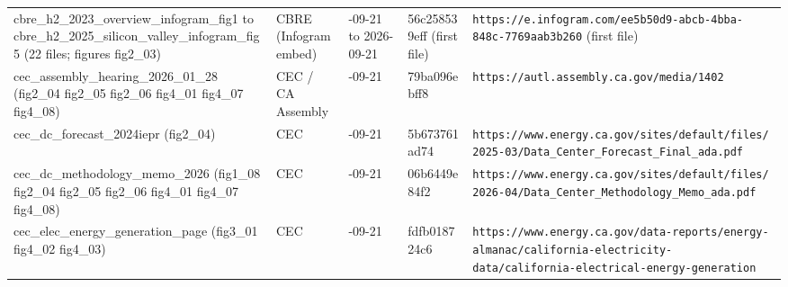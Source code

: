 \begin{longtable}{>{\raggedright\arraybackslash}p{3.0cm}>{\raggedright\arraybackslash}p{1.5cm}>{\raggedright\arraybackslash}p{1.4cm}>{\raggedright\arraybackslash}p{2.0cm}>{\raggedright\arraybackslash}p{6.0cm}}
cbre\_\allowbreak{}h2\_\allowbreak{}2023\_\allowbreak{}overview\_\allowbreak{}infogram\_\allowbreak{}fig1 to cbre\_\allowbreak{}h2\_\allowbreak{}2025\_\allowbreak{}silicon\_\allowbreak{}valley\_\allowbreak{}infogram\_\allowbreak{}fig5 (22 files; figures fig2\_\allowbreak{}03) & CBRE \allowbreak{}(Infogram embed)\allowbreak{} & 2026-09-21 to 2026-09-21 & 56c258539eff (first file) & \texttt{https:\allowbreak{}/\allowbreak{}/\allowbreak{}e.\allowbreak{}infogram.\allowbreak{}com/\allowbreak{}ee5b50d9-\allowbreak{}abcb-\allowbreak{}4bba-\allowbreak{}848c-\allowbreak{}7769aab3b260} (first file) \\
cec\_\allowbreak{}assembly\_\allowbreak{}hearing\_\allowbreak{}2026\_\allowbreak{}01\_\allowbreak{}28 (fig2\_\allowbreak{}04 fig2\_\allowbreak{}05 fig2\_\allowbreak{}06 fig4\_\allowbreak{}01 fig4\_\allowbreak{}07 fig4\_\allowbreak{}08) & CEC /\allowbreak{} CA Assembly & 2026-09-21 & 79ba096ebff8 & \texttt{https:\allowbreak{}/\allowbreak{}/\allowbreak{}autl.\allowbreak{}assembly.\allowbreak{}ca.\allowbreak{}gov/\allowbreak{}media/\allowbreak{}1402} \\
cec\_\allowbreak{}dc\_\allowbreak{}forecast\_\allowbreak{}2024iepr (fig2\_\allowbreak{}04) & CEC & 2026-09-21 & 5b673761ad74 & \texttt{https:\allowbreak{}/\allowbreak{}/\allowbreak{}www.\allowbreak{}energy.\allowbreak{}ca.\allowbreak{}gov/\allowbreak{}sites/\allowbreak{}default/\allowbreak{}files/\allowbreak{}2025-\allowbreak{}03/\allowbreak{}Data\_\allowbreak{}Center\_\allowbreak{}Forecast\_\allowbreak{}Final\_\allowbreak{}ada.\allowbreak{}pdf} \\
cec\_\allowbreak{}dc\_\allowbreak{}methodology\_\allowbreak{}memo\_\allowbreak{}2026 (fig1\_\allowbreak{}08 fig2\_\allowbreak{}04 fig2\_\allowbreak{}05 fig2\_\allowbreak{}06 fig4\_\allowbreak{}01 fig4\_\allowbreak{}07 fig4\_\allowbreak{}08) & CEC & 2026-09-21 & 06b6449e84f2 & \texttt{https:\allowbreak{}/\allowbreak{}/\allowbreak{}www.\allowbreak{}energy.\allowbreak{}ca.\allowbreak{}gov/\allowbreak{}sites/\allowbreak{}default/\allowbreak{}files/\allowbreak{}2026-\allowbreak{}04/\allowbreak{}Data\_\allowbreak{}Center\_\allowbreak{}Methodology\_\allowbreak{}Memo\_\allowbreak{}ada.\allowbreak{}pdf} \\
cec\_\allowbreak{}elec\_\allowbreak{}energy\_\allowbreak{}generation\_\allowbreak{}page (fig3\_\allowbreak{}01 fig4\_\allowbreak{}02 fig4\_\allowbreak{}03) & CEC & 2026-09-21 & fdfb018724c6 & \texttt{https:\allowbreak{}/\allowbreak{}/\allowbreak{}www.\allowbreak{}energy.\allowbreak{}ca.\allowbreak{}gov/\allowbreak{}data-\allowbreak{}reports/\allowbreak{}energy-\allowbreak{}almanac/\allowbreak{}california-\allowbreak{}electricity-\allowbreak{}data/\allowbreak{}california-\allowbreak{}electrical-\allowbreak{}energy-\allowbreak{}generation} \\

\end{longtable}
